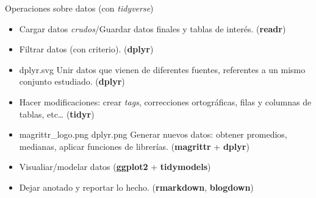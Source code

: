 \documentclass[
  10pt,
  ignorenonframetext,
]{beamer}
\providecommand{\tightlist}{%
  \setlength{\itemsep}{0pt}\setlength{\parskip}{0pt}}
\begin{document}
\begin{frame}{Operaciones sobre datos (con \emph{tidyverse})}
\protect\hypertarget{operaciones-sobre-datos-con-tidyverse}{}
\begin{itemize}
\tightlist
\item
  Cargar datos \emph{crudos}/Guardar datos finales y tablas de interés.
  (\textbf{readr}) \vspace{10pt}
\item
  Filtrar datos (con criterio). (\textbf{dplyr}) \vspace{10pt}
\item
  dplyr.svg Unir datos que vienen de diferentes fuentes, referentes a un
  mismo conjunto estudiado. (\textbf{dplyr}) \vspace{10pt}
\item
  Hacer modificaciones: crear \emph{tags}, correcciones ortográficas,
  filas y columnas de tablas, etc\ldots{} (\textbf{tidyr}) \vspace{10pt}
\item
  magrittr\_logo.png dplyr.png Generar nuevos datos: obtener promedios,
  medianas, aplicar funciones de librerías. (\textbf{magrittr} +
  \textbf{dplyr}) \vspace{10pt}
\item
  Visualiar/modelar datos (\textbf{ggplot2} + \textbf{tidymodels})
  \vspace{10pt}
\item
  Dejar anotado y reportar lo hecho. (\textbf{rmarkdown},
  \textbf{blogdown})
\end{itemize}
\end{frame}
\end{document}
